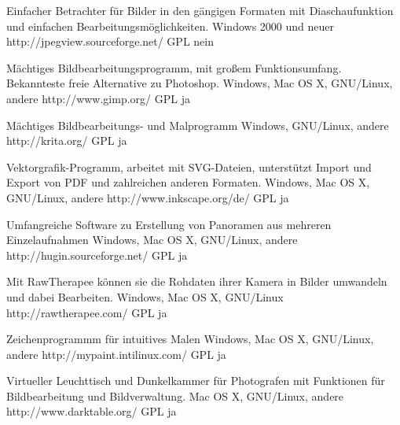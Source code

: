 \documentclass[11pt,a4paper,landscape,twocolumn]{article}
\begin{document}

{Einfacher Betrachter für Bilder in den gängigen Formaten mit Diaschaufunktion und einfachen Bearbeitungsmöglichkeiten.}
{Windows 2000 und neuer}
{http://jpegview.sourceforge.net/}
{GPL}
{nein}

{Mächtiges Bildbearbeitungsprogramm, mit großem Funktionsumfang. Bekannteste freie Alternative zu Photoshop.}
{Windows, Mac OS X, GNU/Linux, andere}
{http://www.gimp.org/}
{GPL}
{ja}

{Mächtiges Bildbearbeitungs- und Malprogramm}
{Windows, GNU/Linux, andere}
{http://krita.org/}
{GPL}
{ja}

{Vektorgrafik-Programm, arbeitet mit SVG-Dateien, unterstützt Import und Export von PDF und zahlreichen anderen Formaten.}
{Windows, Mac OS X, GNU/Linux, andere}
{http://www.inkscape.org/de/}
{GPL}
{ja}

\newpage %

{Umfangreiche Software zu Erstellung von Panoramen aus mehreren Einzelaufnahmen}
{Windows, Mac OS X, GNU/Linux, andere}
{http://hugin.sourceforge.net/}
{GPL}
{ja}

{Mit RawTherapee können sie die Rohdaten ihrer Kamera in Bilder umwandeln und dabei Bearbeiten.}
{Windows, Mac OS X, GNU/Linux}
{http://rawtherapee.com/ }
{GPL}
{ja}

{Zeichenprogrammm für intuitives Malen}
{Windows, Mac OS X, GNU/Linux, andere}
{http://mypaint.intilinux.com/}
{GPL}
{ja}

{Virtueller Leuchttisch und Dunkelkammer für Photografen mit Funktionen für Bildbearbeitung und Bildverwaltung.}
{Mac OS X, GNU/Linux, andere}
{http://www.darktable.org/}
{GPL}
{ja}
\end{document}
